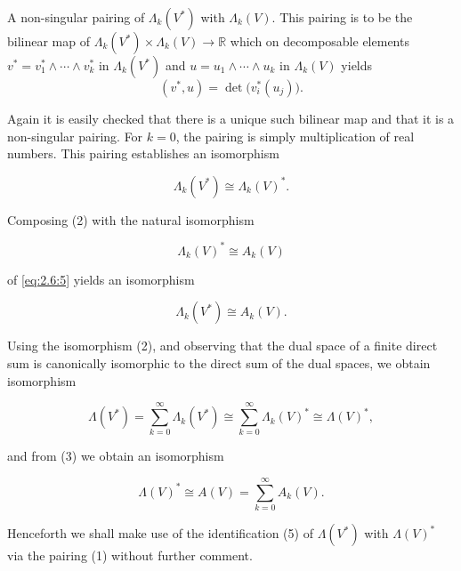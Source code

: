 \begin{definition}\label{thm:2.9}
A non-singular pairing of $\Lambda_k(V^*)$ with $\Lambda_k(V)$. This pairing is to be the bilinear map of $\Lambda_k(V^*) \times \Lambda_k(V) \to \mathbb{R}$ which on decomposable elements $v^* = v_1^* \wedge \cdots \wedge v_k^*$ in $\Lambda_k(V^*)$ and $u = u_1 \wedge \cdots \wedge u_k$ in $\Lambda_k(V)$ yields
\begin{equation}
\tag{1}\label{eq:2.9:1}
(v^{*},u)=\det\big(v_{i}^{*}(u_{j})\big).
\end{equation}


Again it is easily checked that there is a unique such bilinear map and that it is a non-singular pairing. For $k=0$, the pairing is simply multiplication of real numbers. This pairing establishes an isomorphism


\begin{equation}
\tag{2}\label{eq:2.9:2}
\Lambda_{k}(V^{*})\cong\Lambda_{k}(V)^{*}.
\end{equation}

Composing (2) with the natural isomorphism

\begin{equation}
\tag{3}\label{eq:2.9:3}
\Lambda_{k}(V)^{*}\cong A_{k}(V)
\end{equation}

of \eqref{eq:2.6:5} yields an isomorphism

\begin{equation}
\tag{4}\label{eq:2.9:4}
\Lambda_{k}(V^{*})\cong A_{k}(V).
\end{equation}

Using the isomorphism (2), and observing that the dual space of a finite direct sum is canonically isomorphic to the direct sum of the dual spaces, we obtain isomorphism

\begin{equation}
\tag{5}\label{eq:2.9:5}
\Lambda(V^{*})=\sum_{k=0}^{\infty}\Lambda_{k}(V^{*})\cong\sum_{k=0}^{\infty}\Lambda_{k}(V)^{*}\cong\Lambda(V)^{*},
\end{equation}

and from (3) we obtain an isomorphism

\begin{equation}
\tag{6}\label{eq:2.9:6}
\Lambda(V)^{*}\cong A(V)=\sum_{k=0}^{\infty}A_{k}(V).
\end{equation}

Henceforth we shall make use of the identification (5) of $\Lambda(V^{*})$ with $\Lambda(V)^{*}$ via the pairing (1) without further comment.

\end{definition}

